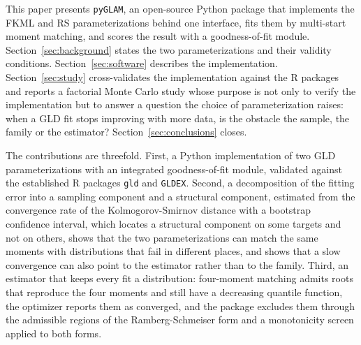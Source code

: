 This paper presents \texttt{pyGLAM}, an open-source Python package that
implements the FKML and RS parameterizations behind one interface, fits them by
multi-start moment matching, and scores the result with a goodness-of-fit module.
Section~\ref{sec:background} states the two parameterizations and their validity
conditions. Section~\ref{sec:software} describes the implementation.
Section~\ref{sec:study} cross-validates the implementation against the R
packages and reports a factorial Monte Carlo study whose purpose is not only to
verify the implementation but to answer a question the choice of
parameterization raises: when a GLD fit stops improving with more data, is the
obstacle the sample, the family or the estimator? Section~\ref{sec:conclusions}
closes.

The contributions are threefold. First, a Python implementation of two GLD
parameterizations with an integrated goodness-of-fit module, validated against
the established R packages \texttt{gld} and \texttt{GLDEX}. Second, a
decomposition of the fitting error into a sampling component and a structural
component, estimated from the convergence rate of the Kolmogorov-Smirnov
distance with a bootstrap confidence interval, which locates a structural
component on some targets and not on others, shows that the two
parameterizations can match the same moments with distributions that fail in
different places, and shows that a slow convergence can also point to the
estimator rather than to the family. Third, an estimator that keeps every fit a
distribution: four-moment matching admits roots that reproduce the four moments
and still have a decreasing quantile function, the optimizer reports them as
converged, and the package excludes them through the admissible regions of the
Ramberg-Schmeiser form and a monotonicity screen applied to both forms.
